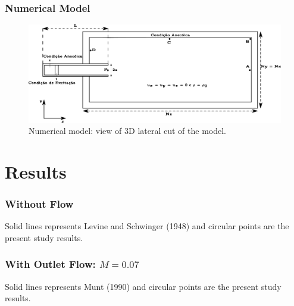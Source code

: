 \documentclass[dvipsnames,12pt]{beamer}
\begin{document}
\begin{frame}
\frametitle{Numerical Model}
\begin{figure}[ht!]
\centering
  \includegraphics[width=1.\linewidth]{figuras/modelo_numerico_2.pdf}
  \caption{Numerical model: view of 3D lateral cut of the  model.}
  \label{fig:modelo}
\end{figure}
\end{frame}

\newcommand\scalex{1}
\newcommand\scaley{1}
\newcommand\scaleA{0.5}


\section{Results}
\begin{frame}
\frametitle{Without Flow}
\begin{minipage}[t][][t]{0.45\textwidth}
    \begin{figure}
  \centering

\end{figure}
\end{minipage}
\hfill
\begin{minipage}[t]{0.45\textwidth}
\begin{figure}
    
\end{figure}
\end{minipage}
\centering
Solid lines represents Levine and Schwinger (1948) and circular points are the present study results.
\end{frame}



\begin{frame}
\frametitle{With Outlet Flow: $M = 0.07$ }
\begin{minipage}[t][][t]{0.45\textwidth}
    \begin{figure}
  \centering

\end{figure}
\end{minipage}
\hfill
\begin{minipage}[t]{0.45\textwidth}
\begin{figure}
    
\end{figure}
\end{minipage}
\centering
Solid lines represents Munt (1990) and circular points are the present study results.
\end{frame}
\end{document}

